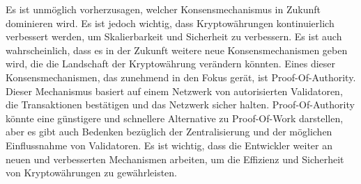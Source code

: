 Es ist unmöglich vorherzusagen, welcher Konsensmechanismus in Zukunft dominieren wird. Es ist jedoch wichtig, dass Kryptowährungen kontinuierlich verbessert werden, um Skalierbarkeit und Sicherheit zu verbessern. Es ist auch wahrscheinlich, dass es in der Zukunft weitere neue Konsensmechanismen geben wird, die die Landschaft der Kryptowährung verändern könnten. Eines dieser Konsensmechanismen, das zunehmend in den Fokus gerät, ist Proof-Of-Authority. Dieser Mechanismus basiert auf einem Netzwerk von autorisierten Validatoren, die Transaktionen bestätigen und das Netzwerk sicher halten. Proof-Of-Authority könnte eine günstigere und schnellere Alternative zu Proof-Of-Work darstellen, aber es gibt auch Bedenken bezüglich der Zentralisierung und der möglichen Einflussnahme von Validatoren. Es ist wichtig, dass die Entwickler weiter an neuen und verbesserten Mechanismen arbeiten, um die Effizienz und Sicherheit von Kryptowährungen zu gewährleisten.

\backmatter                     %

\printbibliography



